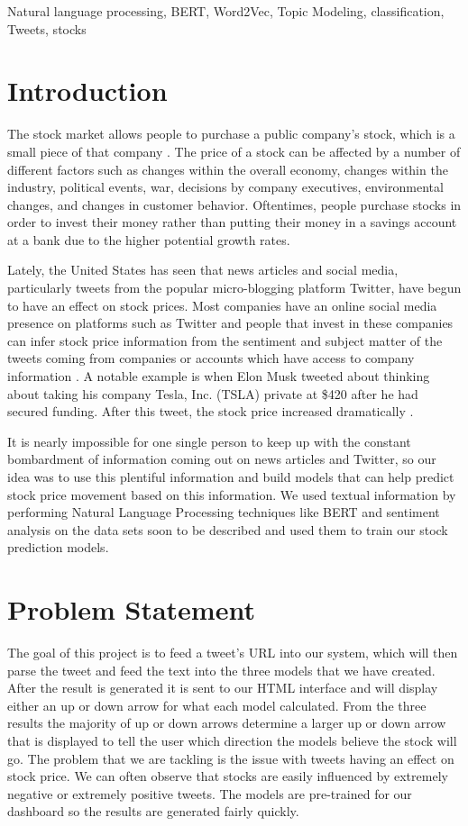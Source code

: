 \documentclass[conference]{IEEEtran}
\begin{document}
\begin{IEEEkeywords}
    Natural language processing, BERT, Word2Vec, Topic Modeling, classification, Tweets, stocks
\end{IEEEkeywords}

\section{Introduction}
The stock market allows people to purchase a public company’s stock, which is a small piece of that company \cite{b2}. The price of a stock can be affected by a number of different factors such as changes within the overall economy, changes within the industry, political events, war, decisions by company executives, environmental changes, and changes in customer behavior. Oftentimes, people purchase stocks in order to invest their money rather than putting their money in a savings account at a bank due to the higher potential growth rates.

Lately, the United States has seen that news articles and social media, particularly tweets from the popular micro-blogging platform Twitter, have begun to have an effect on stock prices. Most companies have an online social media presence on platforms such as Twitter and people that invest in these companies can infer stock price information from the sentiment and subject matter of the tweets coming from companies or accounts which have access to company information \cite{b6}. A notable example is when Elon Musk tweeted about thinking about taking his company Tesla, Inc. (TSLA) private at \$420 after he had secured funding. After this tweet, the stock price increased dramatically \cite{b4}.

It is nearly impossible for one single person to keep up with the constant bombardment of information coming out on news articles and Twitter, so our idea was to use this plentiful information and build models that can help predict stock price movement based on this information. We used textual information by performing Natural Language Processing techniques like BERT and sentiment analysis on the data sets soon to be described and used them to train our stock prediction models.

\section{Problem Statement}
The goal of this project is to feed a tweet's URL into our system, which will then parse the tweet and feed the text into the three models that we have created. After the result is generated it is sent to our HTML interface and will display either an up or down arrow for what each model calculated. From the three results the majority of up or down arrows determine a larger up or down arrow that is displayed to tell the user which direction the models believe the stock will go. The problem that we are tackling is the issue with tweets having an effect on stock price. We can often observe that stocks are easily influenced by extremely negative or extremely positive tweets. The models are pre-trained for our dashboard so the results are generated fairly quickly.
\end{document}
